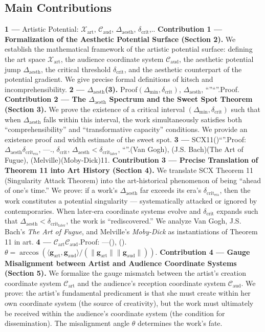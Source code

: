 \documentclass[12pt,a4paper]{article}
\theoremstyle{remark}
\newcommand{\norm}[1]{\|#1\|}
\newcommand{\inner}[2]{\langle #1, #2 \rangle}
\newcommand{\ArtSpace}{\mathcal{X}_{\text{art}}}
\newcommand{\AudCoord}{\mathcal{C}_{\text{aud}}}
\newcommand{\ArtCoord}{\mathcal{C}_{\text{art}}}
\newcommand{\AesthDelta}{\Delta_{\text{aesth}}}
\newcommand{\CritDelta}{\delta_{\text{crit}}}
\newcommand{\GParam}{\mathbf{g}}
\begin{document}
\subsection{Main Contributions}
\noindent\textbf{ 1 ---}
Artistic Potential: $\ArtSpace$, $\AudCoord$, $\AesthDelta$, $\CritDelta$,..
\textbf{Contribution 1 --- Formalization of the Aesthetic Potential Surface (Section 2).}
We establish the mathematical framework of the artistic potential surface: defining the art space $\ArtSpace$, the audience coordinate system $\AudCoord$, the aesthetic potential jump $\AesthDelta$, the critical threshold $\CritDelta$, and the aesthetic counterpart of the potential gradient. We give precise formal definitions of kitsch and incomprehensibility.
\medskip
\noindent\textbf{ 2 --- $\AesthDelta$(3).}
Proof$(\Delta_{\text{min}}, \CritDelta)$, $\AesthDelta$, ``''``''.Proof.
\textbf{Contribution 2 --- The $\AesthDelta$ Spectrum and the Sweet Spot Theorem (Section 3).}
We prove the existence of a critical interval $(\Delta_{\text{min}}, \CritDelta)$ such that when $\AesthDelta$ falls within this interval, the work simultaneously satisfies both ``comprehensibility'' and ``transformative capacity'' conditions. We provide an existence proof and width estimate of the sweet spot.
\medskip
\noindent\textbf{ 3 ---}
SCX11()``''.Proof: $\AesthDelta$$\CritDelta_{\text{era}}$, ---., $\CritDelta$, $\AesthDelta < \CritDelta_{\text{later}}$, ``''.(Van Gogh), (J.S. Bach){\kaishu}(The Art of Fugue), (Melville){\kaishu}(Moby-Dick)11.
\textbf{Contribution 3 --- Precise Translation of Theorem 11 into Art History (Section 4).}
We translate SCX Theorem 11 (Singularity Attack Theorem) into the art-historical phenomenon of being ``ahead of one's time.'' We prove: if a work's $\AesthDelta$ far exceeds its era's $\CritDelta_{\text{era}}$, then the work constitutes a potential singularity --- systematically attacked or ignored by contemporaries. When later-era coordinate systems evolve and $\CritDelta$ expands such that $\AesthDelta < \CritDelta_{\text{later}}$, the work is ``rediscovered.'' We analyze Van Gogh, J.S. Bach's \textit{The Art of Fugue}, and Melville's \textit{Moby-Dick} as instantiations of Theorem 11 in art.
\medskip
\noindent\textbf{ 4 ---}
$\ArtCoord$$\AudCoord$.Proof: ---(), ().$\theta = \arccos(\inner{\GParam_{\text{art}}}{\GParam_{\text{aud}}} / (\norm{\GParam_{\text{art}}}\norm{\GParam_{\text{aud}}}))$.
\textbf{Contribution 4 --- Gauge Misalignment between Artist and Audience Coordinate Systems (Section 5).}
We formalize the gauge mismatch between the artist's creation coordinate system $\ArtCoord$ and the audience's reception coordinate system $\AudCoord$. We prove: the artist's fundamental predicament is that she must create within her own coordinate system (the source of creativity), but the work must ultimately be received within the audience's coordinate system (the condition for dissemination). The misalignment angle $\theta$ determines the work's fate.
\end{document}
